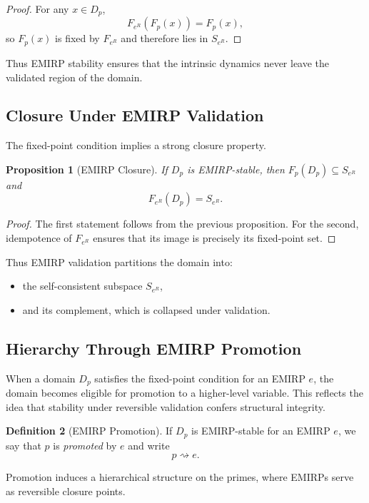 \documentclass[11pt]{article}
\theoremstyle{definition}
\newtheorem{definition}{Definition}[section]
\theoremstyle{plain}
\newtheorem{proposition}[definition]{Proposition}
\theoremstyle{remark}
\begin{document}
\begin{proof}
For any $x \in D_p$,
\[
F_{e^R}(F_p(x)) = F_p(x),
\]
so $F_p(x)$ is fixed by $F_{e^R}$ and therefore lies in $S_{e^R}$.
\end{proof}

Thus EMIRP stability ensures that the intrinsic dynamics never leave the
validated region of the domain.

\subsection{Closure Under EMIRP Validation}

The fixed-point condition implies a strong closure property.

\begin{proposition}[EMIRP Closure]
If $D_p$ is EMIRP-stable, then $F_p(D_p) \subseteq S_{e^R}$ and
\[
F_{e^R}(D_p) = S_{e^R}.
\]
\end{proposition}

\begin{proof}
The first statement follows from the previous proposition. For the
second, idempotence of $F_{e^R}$ ensures that its image is precisely its
fixed-point set.
\end{proof}

Thus EMIRP validation partitions the domain into:

\begin{itemize}
    \item the self-consistent subspace $S_{e^R}$,
    \item and its complement, which is collapsed under validation.
\end{itemize}

\subsection{Hierarchy Through EMIRP Promotion}

When a domain $D_p$ satisfies the fixed-point condition for an EMIRP
$e$, the domain becomes eligible for promotion to a higher-level
variable. This reflects the idea that stability under reversible
validation confers structural integrity.

\begin{definition}[EMIRP Promotion]
If $D_p$ is EMIRP-stable for an EMIRP $e$, we say that $p$ is
\emph{promoted} by $e$ and write
\[
p \rightsquigarrow e.
\]
\end{definition}

Promotion induces a hierarchical structure on the primes, where EMIRPs
serve as reversible closure points.
\end{document}
